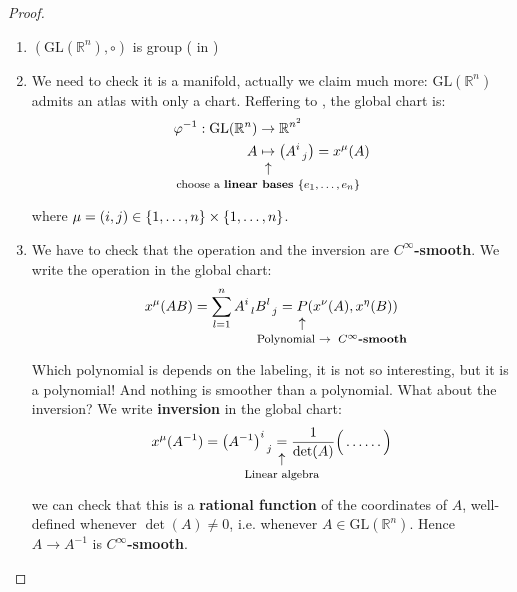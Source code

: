 \documentclass[../main.tex]{subfiles}
\begin{document}
\begin{proof}
\begin{enumerate}
    \item $(\textrm{GL}(\mathbb{R}^n), \circ )$ is group ( in )
    \item We need to check it is a manifold, actually we claim much more: $\textrm{GL}(\mathbb{R}^n)$ admits an atlas with only a chart. Reffering to , the global chart is:
    \[
    \begin{split}
        \varphi^{-1}: \textrm{GL}(\mathbb{R}^n)&\to \mathbb{R}^{n^2}\\
        A &\underset{\mathclap{\tikz \node {$\uparrow$} node [below=1ex] {\footnotesize choose a \textbf{linear bases $\Bqty{e_1,\dots,e_n}$} };}}{\mapsto} \pqty{A^i_{\;\;j}}=x^\mu(A)
    \end{split}
    \]
    where $\mu=(i,j)\in\Bqty{1,\dots,n}\times\Bqty{1,\dots,n}$.
    \item We have to check that the operation and the inversion are $C^\infty$\textbf{-smooth}. We write the operation in the global chart:
    \[
    x^\mu(AB)=\sum_{l=1}^nA^i_{\;\;l}B^l_{\;\;j}=\underset{\mathclap{\tikz \node {$\uparrow$} node [below=1ex] {\footnotesize $\qquad\qquad\quad$Polynomial $\rightarrow \ C^\infty$\textbf{-smooth} };}}{P}\pqty{x^\nu(A),x^\eta(B)}
    \]
    Which polynomial is depends on the labeling, it is not so interesting, but it is a polynomial! And nothing is smoother than a polynomial. What about the inversion? We write \textbf{inversion} in the global chart:
    \[
    x^\mu(A^{-1})=\pqty{A^{-1}}^i_{\;\;j}\underset{\mathclap{\tikz \node {$\uparrow$} node [below=1ex] {\footnotesize Linear algebra };}}{=}\frac{1}{\det(A)}\Big(\dots\dots\Big)
    \]
    we can check that this is a \textbf{rational function} of the coordinates of $A$, well-defined whenever $\det(A)\neq 0$, i.e. whenever $A \in \textrm{GL}(\mathbb{R}^n)$. Hence $A\to A^{-1}$ is $C^\infty$\textbf{-smooth}.
\end{enumerate}
\end{proof}
\end{document}

